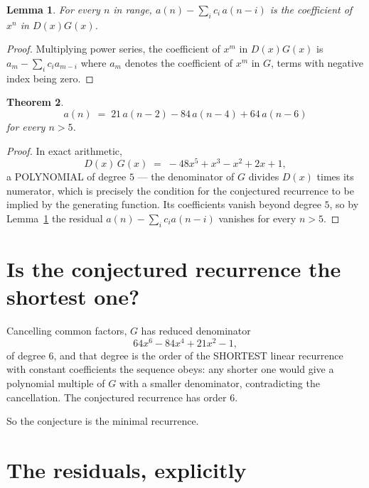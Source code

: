 \documentclass[11pt,a4paper]{article}
\theoremstyle{plain}
\newtheorem{theorem}{Theorem}
\newtheorem{lemma}[theorem]{Lemma}
\theoremstyle{definition}
\begin{document}
\begin{lemma}\label{lem:key}
For every $n$ in range, $a(n)-\sum_i c_i\,a(n-i)$ is the coefficient of $x^{n}$ in
$D(x)G(x)$.
\end{lemma}

\begin{proof}
Multiplying power series, the coefficient of $x^{m}$ in $D(x)G(x)$ is
$a_m-\sum_i c_i a_{m-i}$ where $a_m$ denotes the coefficient of $x^{m}$ in $G$, terms with
negative index being zero.
\end{proof}

\begin{theorem}
\[
a(n)\;=\;21\,a(n-2) - 84\,a(n-4) + 64\,a(n-6)
\]
for every $n>5$.
\end{theorem}

\begin{proof}
In exact arithmetic,
\[
D(x)\,G(x)\;=\;- 48 x^{5} + x^{3} - x^{2} + 2 x + 1,
\]
a POLYNOMIAL of degree $5$ --- the denominator of $G$ divides $D(x)$ times its numerator,
which is precisely the condition for the conjectured recurrence to be implied by the
generating function. Its coefficients vanish beyond degree $5$, so by
Lemma~\ref{lem:key} the residual $a(n)-\sum_ic_ia(n-i)$ vanishes for every
$n>5$.
\end{proof}

\section{Is the conjectured recurrence the shortest one?}

Cancelling common factors, $G$ has reduced denominator
\[
64 x^{6} - 84 x^{4} + 21 x^{2} - 1,
\]
of degree $6$, and that degree is the order of the SHORTEST linear recurrence with
constant coefficients the sequence obeys: any shorter one would give a polynomial multiple of
$G$ with a smaller denominator, contradicting the cancellation. The conjectured recurrence has
order $6$.

So the conjecture is the minimal recurrence.

\section{The residuals, explicitly}
\end{document}

